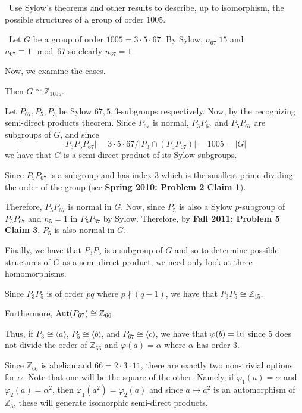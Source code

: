 \documentclass[12pt]{AlgebraQual}
\begin{document}
\begin{problem} $\,$
Use Sylow's theorems and other results to describe, up to isomorphism, the possible structures of a group of order $1005$.
\end{problem}


\begin{solution}$\,$
Let $G$ be a group of order $1005=3\cdot5\cdot 67.$ By Sylow, $n_{67}|15$ and $n_{67}\equiv 1\mod67$ so clearly $n_{67}=1$.

Now, we examine the cases.

 Then $G\cong\mathbb{Z}_{1005}.$

Let $P_{67},P_5,P_3$ be Sylow $67,5,3$-subgroups respectively. Now, by the recognizing semi-direct products theorem. Since $P_{67}$ is normal, $P_3P_{67}$ and $P_5P_{67}$ are subgroups of $G$, and since $$|P_3P_5P_{67}|=3\cdot5\cdot67/|P_3\cap(P_5P_{67})|=1005=|G|$$ we have that $G$ is a semi-direct product of its Sylow subgroups.

Since $P_5P_{67}$ is a subgroup and has index $3$ which is the smallest prime dividing the order of the group (see \textbf{Spring 2010: Problem 2 Claim 1}).

Therefore, $P_5P_{67}$ is normal in $G$. Now, since $P_5$ is also a Sylow $p$-subgroup of $P_5P_{67}$ and $n_5=1$ in $P_5P_{67}$ by Sylow. Therefore, by \textbf{Fall 2011: Problem 5 Claim 3}, $P_5$ is also normal in $G$.

Finally, we have that $P_3P_5$ is a subgroup of $G$ and so to determine possible structures of $G$ as a semi-direct product, we need only look at three homomorphisms.

 Since $P_3P_5$ is of order $pq$ where $p\nmid(q-1)$, we have that $P_3P_5\cong\mathbb{Z}_{15}.$

Furthermore, $\text{Aut}(P_{67})\cong\mathbb{Z}_{66}$.

Thus, if $P_3\cong\langle a\rangle$, $P_5\cong\langle b\rangle$, and $P_{67}\cong\langle c\rangle$, we have that $\varphi(b)=\text{Id}$ since $5$ does not divide the order of $\mathbb{Z}_{66}$ and $\varphi(a)=\alpha$ where $\alpha$ has order $3.$

Since $\mathbb{Z}_{66}$ is abelian and $66=2\cdot3\cdot 11$, there are exactly two non-trivial options for $\alpha$. Note that one will be the square of the other. Namely, if $\varphi_1(a)=\alpha$ and $\varphi_2(a)=\alpha^2$, then $\varphi_1(a^2)=\varphi_2(a)$ and since $a\mapsto a^2$ is an automorphism of $\mathbb{Z}_3$, these will generate isomorphic semi-direct products.


\end{solution}
\end{document}
